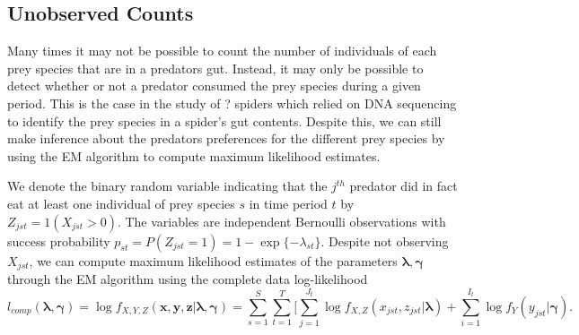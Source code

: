 \subsection{Unobserved Counts}


Many times it may not be possible to count the number of individuals of each prey species that are in a predators gut. Instead, it may only be possible to detect whether or not a predator consumed the prey species during a given period. This is the case in the study of ? spiders which relied on DNA sequencing to identify the prey species in a spider's gut contents. Despite this, we can still make inference about the predators preferences for the different prey species by using the EM algorithm to compute maximum likelihood estimates. 

We denote the binary random variable indicating that the $j^{th}$ predator did in fact eat at least one individual of prey species $s$ in time period $t$ by $Z_{jst} = 1(X_{jst} > 0)$.  The variables are independent Bernoulli observations with success probability $p_{st} = P(Z_{jst}=1)= 1-\exp\{-\lambda_{st}\}$.  Despite not observing $X_{jst}$, we can compute maximum likelihood estimates of the parameters $\boldsymbol{\lambda}, \boldsymbol{\gamma}$ through the EM algorithm using the complete data log-likelihood
\[
l_{comp}(\boldsymbol{\lambda}, \boldsymbol{\gamma}) = \log f_{X,Y,Z}(\boldsymbol x, \boldsymbol y, \boldsymbol z|\boldsymbol{\lambda}, \boldsymbol{\gamma}) = \sum_{s=1}^{S} \sum_{t=1}^T [\sum_{j=1}^{J_t} \log f_{X,Z}(x_{jst},z_{jst}|\boldsymbol{\lambda}) + \sum_{i=1}^{I_t}\log f_Y(y_{jst}|\boldsymbol{\gamma}).
\]

